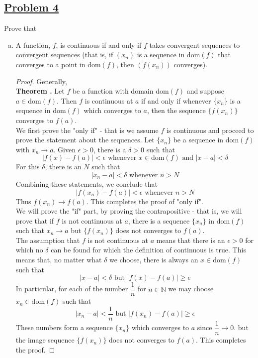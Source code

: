 \documentclass[10pt,letterpaper]{article}
\begin{document}
	\subsection*{{\color{purple}\underline{Problem 4}}}
	Prove that 
	\begin{enumerate}[(a)]
	\item A function, $f$, is continuous if and only if $f$ takes convergent sequences to convergent sequences (that
is, if $(x_n)$ is a sequence in $\mathrm{dom}(f)$ that converges to a point in 
$\mathrm{dom}(f)$, then $(f(x_n))$ converges).
\begin{proof}
	Generally, \\
	\textbf{Theorem .} Let $f$ be a function with domain $\mathrm{dom}(f)$ and suppose $a \in \mathrm{dom}(f)$. Then 
	$f$ is continuous at $a$ if and only if whenever $\{x_n\}$ is a sequence in $\mathrm{dom}(f)$ which converges
	to $a$, then the sequence $\{f(x_n)\}$ converges to $f(a)$. \\
	We first prove the "only if" - that is we assume $f$ is continuous and proceed to prove the statement about the sequences.
	Let $\{x_n\}$ be a sequence in $\mathrm{dom}(f)$ with $x_n \rightarrow a$. Given $\epsilon > 0$, there is a $\delta > 0$ such
	that
	$$|f(x) - f(a)| < \epsilon \text{ whenever } x \in \mathrm{dom}(f) \text{ and } |x - a| < \delta $$
	For this $\delta$, there is an $N$ such that
	$$|x_n - a| < \delta \text{ whenever } n > N$$
	Combining these statements, we conclude that
	$$|f(x_n) - f(a)| < \epsilon \text{ whenever } n > N$$
	Thus $f(x_n) \rightarrow f(a)$. This completes the proof of "only if". \\
	
	We will prove the "if" part, by proving the contrapositive - that is, we will prove that if 
	$f$ is not continuous at $a$, there is a sequence $\{x_n\}$ in $\mathrm{dom}(f)$ such that 
	$x_n \rightarrow a$ but $\{f(x_n)\}$ does not converges to $f(a)$. \\
	The assumption that $f$ is not continuous at $a$ means that there is an $\epsilon > 0$ for 
	which no $\delta$ can be found for which the definition of continuous is true. This means
	that, no matter what $\delta$ we choose, there is always an $x \in \mathrm{dom}(f)$ such that
	$$|x - a| < \delta \text{ but } |f(x) - f(a)| \geq e$$
	In particular, for each of the number $\dfrac{1}{n}$ for $n \in \mathbb{N}$ we may choose
	$x_n \in \mathrm{dom}(f)$ such that 
	$$|x_n - a| < \dfrac{1}{n} \text{ but } |f(x_n) - f(a)| \geq \epsilon$$
	These numbers form a sequence $\{x_n\}$ which converges to $a$ since $\dfrac{1}{n} \rightarrow 0$.
	but the image sequence $\{f(x_n)\}$ does not converges to $f(a)$. This completes the proof.
	

\end{proof}
\end{enumerate}
\end{document}
